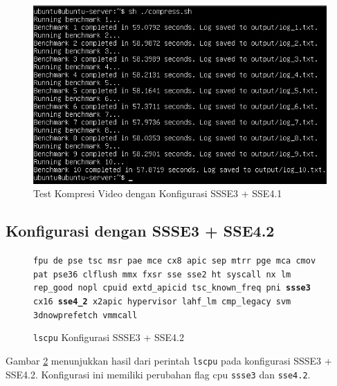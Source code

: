 \begin{figure}
    \centering
    \includegraphics[width=1\textwidth]
    {assets/pics/video-compression-test/ssse3,sse4.1.jpeg}
    \caption{Test Kompresi Video dengan Konfigurasi SSSE3 + SSE4.1}
    \label{fig:video_compression_test_ssse3,sse4.1}
\end{figure}

\subsection{Konfigurasi dengan SSSE3 + SSE4.2}
\begin{figure}
    \texttt{fpu de pse tsc msr pae mce cx8 apic sep mtrr pge mca cmov pat pse36 clflush mmx fxsr sse sse2 ht syscall nx lm rep\_good nopl cpuid extd\_apicid tsc\_known\_freq pni \textbf{ssse3} cx16 \textbf{sse4\_2} x2apic hypervisor lahf\_lm cmp\_legacy svm 3dnowprefetch vmmcall}
    \caption{\texttt{lscpu} Konfigurasi SSSE3 + SSE4.2}
    \label{fig:lscpu_video_compression_test_ssse3,sse4.2}
\end{figure}

Gambar \ref{fig:lscpu_video_compression_test_ssse3,sse4.2} menunjukkan hasil dari perintah \texttt{lscpu} pada konfigurasi SSSE3 + SSE4.2. Konfigurasi ini memiliki perubahan flag cpu \texttt{ssse3} dan \texttt{sse4.2}.

